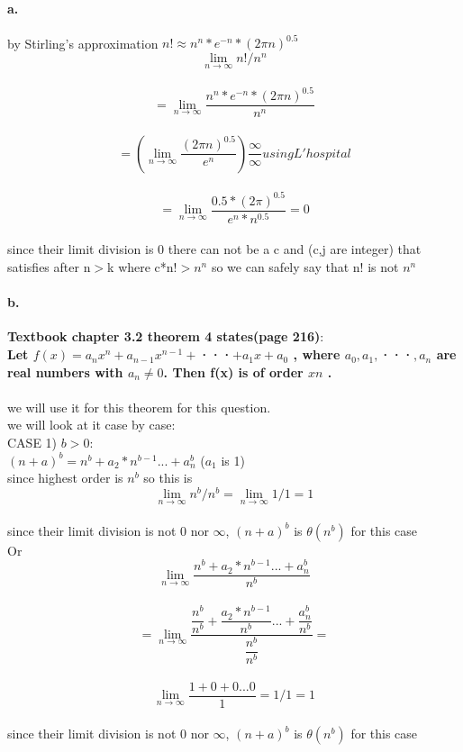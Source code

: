 \documentclass[11pt]{article}
\begin{document}
\paragraph{a.}
by Stirling’s approximation $n!\approx n^{n}*e^{-n}*(2\pi n)^{0.5}$\\
\[ \lim_{n\to\infty} n!/n^{n} \]	\\
\[ =\lim_{n\to\infty} \dfrac{n^{n}*e^{-n}*(2\pi n)^{0.5}}{n^{n}} \] \\
\[ =(\lim_{n\to\infty} \dfrac{(2\pi n)^{0.5}}{e^{n}})\dfrac{\infty}{\infty} using L'hospital\]  \\ 
\[ =\lim_{n\to\infty} \dfrac{0.5*(2\pi )^{0.5}}{e^{n}*n^{0.5}}=0 \]\\
since their limit division is 0 there can not be a c and  (c,j are integer) that satisfies after n$>$k where c*n!$>n^{n}$ so we can safely say that n! is not $n^{n}$

\paragraph{b.}
\textbf{Textbook chapter 3.2 theorem 4 states(page 216)}:\\
\textbf{Let $f (x) = a_n x^{n} + a_{n-1} x^{n-1} + $···$ + a_1 x + a_0$ , where $a_0 , a_1 , $···$ , a_n$ are real numbers with $a_n\neq 0$. Then f(x) is of order $x{n}$ .}\\
\\
we will use it for this theorem for this question.\\
we will look at it case by case:\\
CASE 1) $b>0$:\\
$(n + a)^{b}=n^{b}+a_2*n^{b-1}...+a_n^{b}$ ($a_1$ is 1)  \\
since highest order is $n^{b}$ so this is \\
\[ \lim_{n\to\infty} n^{b}/n^{b}=\lim_{n\to\infty} 1/1=1 \]	\\
since their limit division is not 0 nor $\infty$, $(n+a)^{b}$ is $\theta(n^{b})$ for this case\\
Or \\
\[ \lim_{n\to\infty} \dfrac{n^{b}+a_2*n^{b-1}...+a_n^{b}}{n^{b}}\]	\\
\[ =\lim_{n\to\infty} \dfrac{\dfrac{n^{b}}{n^{b}}+\dfrac{a_2*n^{b-1}}{n^{b}}...+\dfrac{a_n^{b}}{n^{b}}}{\dfrac{n^{b}}{n^{b}}}= \]	\\
\[ \lim_{n\to\infty} \dfrac{1+0+0...0}{1}=1/1=1\]	\\
since their limit division is not 0 nor $\infty$, $(n+a)^{b}$ is $\theta(n^{b})$ for this case\\
\end{document}
